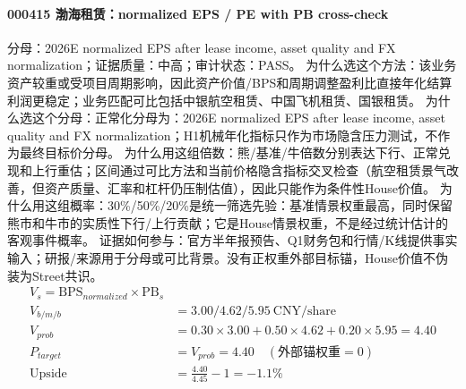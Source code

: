 \paragraph{000415 渤海租赁：normalized EPS / PE with PB cross-check}
分母：2026E normalized EPS after lease income, asset quality and FX normalization；证据质量：中高；审计状态：PASS。
为什么选这个方法：该业务资产较重或受项目周期影响，因此资产价值/BPS和周期调整盈利比直接年化结算利润更稳定；业务匹配可比包括中银航空租赁、中国飞机租赁、国银租赁。
为什么选这个分母：正常化分母为：2026E normalized EPS after lease income, asset quality and FX normalization；H1机械年化指标只作为市场隐含压力测试，不作为最终目标价分母。
为什么用这组倍数：熊/基准/牛倍数分别表达下行、正常兑现和上行重估；区间通过可比方法和当前价格隐含指标交叉检查（航空租赁景气改善，但资产质量、汇率和杠杆仍压制估值），因此只能作为条件性House价值。
为什么用这组概率：30\%/50\%/20\%是统一筛选先验：基准情景权重最高，同时保留熊市和牛市的实质性下行/上行贡献；它是House情景权重，不是经过统计估计的客观事件概率。
证据如何参与：官方半年报预告、Q1财务包和行情/K线提供事实输入；研报/来源用于分母或可比背景。没有正权重外部目标锚，House价值不伪装为Street共识。
\begin{align*}
V_s=\mathrm{BPS}_{normalized}\times \mathrm{PB}_s\\
V_{b/m/b} &= 3.00/4.62/5.95\ \mathrm{CNY/share}\\
V_{prob} &= 0.30\times 3.00+0.50\times 4.62+0.20\times 5.95=4.40\\
P_{target} &= V_{prob}=4.40\quad(\text{外部锚权重}=0)\\
\mathrm{Upside} &= \frac{4.40}{4.45}-1=-1.1\%\\
\end{align*}

